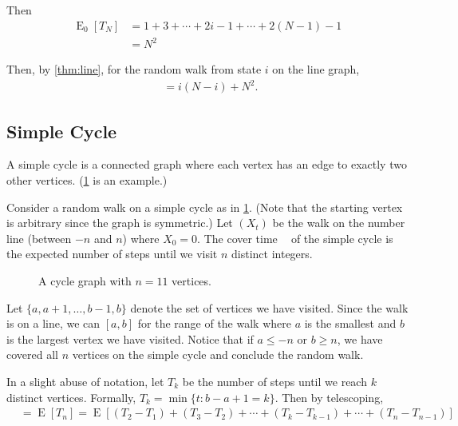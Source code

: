 \documentclass[12pt]{article}
\theoremstyle{definition}
\DeclareMathOperator{\E}{\mathrm{E}}		     %
\DeclareMathOperator{\tcov}{t_\textrm{cov}}      %
\begin{document}
Then
\begin{align}
\E_0[T_N] &= 1 + 3 + \cdots + 2i - 1 + \cdots + 2(N-1) -1 \nonumber \\
&= N^2 \nonumber
\end{align}

Then, by \cref{thm:line}, for the random walk from state $i$ on the line graph,
\begin{align}
\tcov = i(N-i) + N^2. \nonumber
\end{align}

\subsection{Simple Cycle}\label{sec:simple_cycle}

A simple cycle is a connected graph where
each vertex has an edge to exactly two other vertices.
(\cref{fig:cycle} is an example.)

Consider a random walk on a simple cycle as in \cref{fig:cycle}.
(Note that the starting vertex is arbitrary since the graph is symmetric.)
Let $(X_t)$ be the walk on the number line (between $-n$ and $n$)
where $X_0 = 0$.
The cover time $\tcov$ of the simple cycle is the expected number of steps 
until we visit $n$ distinct integers.

\begin{figure}[ht]
	\centering
	\caption{A cycle graph with $n=11$ vertices.}\label{fig:cycle}
\end{figure}

Let $\{a, a+1, \ldots, b-1, b\}$ 
denote the set of vertices we have visited.
Since the walk is on a line, we can $[a,b]$ for the range
of the walk where $a$ is the smallest 
and $b$ is the largest vertex we have visited.
Notice that if $a \leq -n$ or $b \geq n$, we have covered all $n$ vertices
on the simple cycle and conclude the random walk.

In a slight abuse of notation, let $T_k$ be the 
number of steps until we reach $k$ distinct vertices.
Formally, $T_k = \min\{t: b-a+1 = k\}$.
Then by telescoping,
\begin{align}
\tcov &= \E[T_n] = \E[(T_2 - T_1) + (T_3 - T_2) + \cdots + 
(T_k - T_{k-1}) + \cdots + (T_n - T_{n-1})] \nonumber
\end{align}
\end{document}
